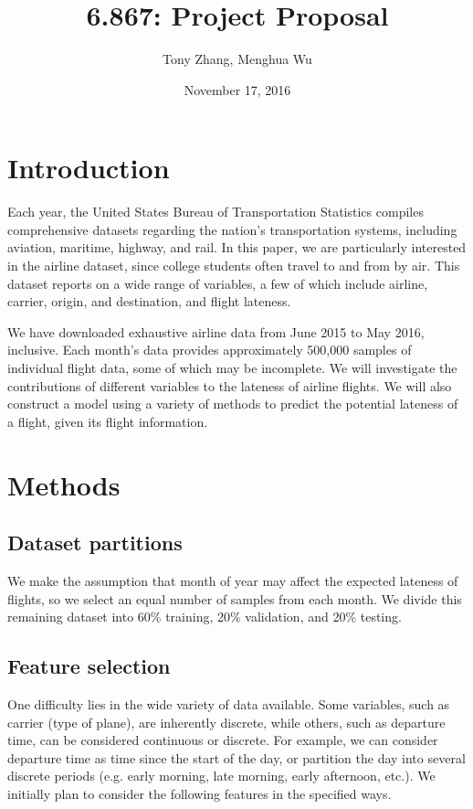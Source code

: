 \documentclass{article}
\title{6.867: Project Proposal}
\date{November 17, 2016}
\author{Tony Zhang, Menghua Wu}
\begin{document}
\maketitle




\section{Introduction}
Each year, the United States Bureau of Transportation Statistics compiles
comprehensive datasets regarding the nation's transportation systems,
including aviation, maritime, highway, and rail.
In this paper, we are particularly interested in the airline dataset,
since college students often travel to and from by air.
This dataset reports on a wide range of variables, a few of which include
airline, carrier, origin, and destination, and flight lateness.

We have downloaded exhaustive airline data
from June 2015 to May 2016, inclusive.
Each month's data provides approximately 500,000 samples
of individual flight data, some of which may be incomplete.
We will investigate the contributions of different variables
to the lateness of airline flights.
We will also construct a model using a variety of methods
to predict the potential lateness of a flight, given its flight information.

\section{Methods}

\subsection{Dataset partitions}
We make the assumption that month of year may affect
the expected lateness of flights,
so we select an equal number of samples from each month.
We divide this remaining dataset into
60\% training,
20\% validation, and
20\% testing.

\subsection{Feature selection}
One difficulty lies in the wide variety of data available.
Some variables, such as carrier (type of plane), are inherently discrete,
while others, such as departure time, can be considered
continuous or discrete.
For example, we can consider departure time as time since
the start of the day, or partition the day into several discrete periods
(e.g. early morning, late morning, early afternoon, etc.).
We initially plan to consider the following features
in the specified ways.
\end{document}
